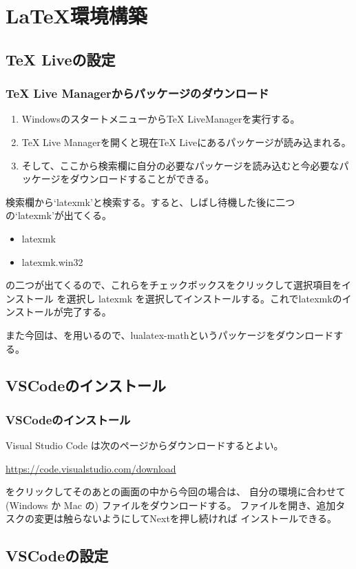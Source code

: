 \documentclass{beamer}
\begin{document}
\section{\LaTeX 環境構築}
\subsection{TeX Liveの設定}
\begin{frame}
  \frametitle{TeX Live Managerからパッケージのダウンロード}
  \begin{enumerate}
    \item WindowsのスタートメニューからTeX LiveManagerを実行する。
    \item TeX Live Managerを開くと現在TeX Liveにあるパッケージが読み込まれる。
    \item そして、ここから検索欄に自分の必要なパッケージを読み込むと今必要なパッケージをダウンロードすることができる。
  \end{enumerate}
 検索欄から`latexmk'と検索する。すると、しばし待機した後に二つの`latexmk'が出てくる。
\begin{itemize}
  \item latexmk
  \item latexmk.win32
\end{itemize}
の二つが出てくるので、これらをチェックボックスをクリックして選択項目をインストール を選択し latexmk を選択してインストールする。これでlatexmkのインストールが完了する。

また今回は、\LuaLaTeX を用いるので、lualatex-mathというパッケージをダウンロードする。
\end{frame}

\subsection{VSCodeのインストール}
\begin{frame}
  \frametitle{VSCodeのインストール}

  Visual Studio Code は次のページからダウンロードするとよい。

	\url{https://code.visualstudio.com/download}

  をクリックしてそのあとの画面の中から今回の場合は、
  自分の環境に合わせて (Windows か Mac の) ファイルをダウンロードする。
  ファイルを開き、追加タスクの変更は触らないようにしてNextを押し続ければ
  インストールできる。
\end{frame}

\subsection{VSCodeの設定}
\end{document}
